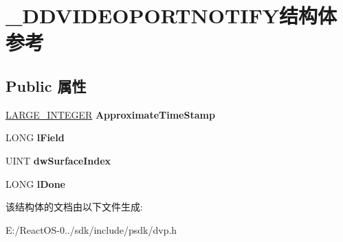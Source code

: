 \hypertarget{struct___d_d_v_i_d_e_o_p_o_r_t_n_o_t_i_f_y}{}\section{\+\_\+\+D\+D\+V\+I\+D\+E\+O\+P\+O\+R\+T\+N\+O\+T\+I\+F\+Y结构体 参考}
\label{struct___d_d_v_i_d_e_o_p_o_r_t_n_o_t_i_f_y}
\subsection*{Public 属性}
\begin{DoxyCompactItemize}
\item 
\mbox{\label{struct___d_d_v_i_d_e_o_p_o_r_t_n_o_t_i_f_y_a885ceac96702913591503ab3dd17159e}} 
\hyperlink{union___l_a_r_g_e___i_n_t_e_g_e_r}{L\+A\+R\+G\+E\+\_\+\+I\+N\+T\+E\+G\+ER} {\bfseries Approximate\+Time\+Stamp}
\item 
\mbox{\label{struct___d_d_v_i_d_e_o_p_o_r_t_n_o_t_i_f_y_a90b62c03de43df4ff69af7d9c2c41746}} 
L\+O\+NG {\bfseries l\+Field}
\item 
\mbox{\label{struct___d_d_v_i_d_e_o_p_o_r_t_n_o_t_i_f_y_aabededfd79107ff5a707d5ec6fb8167d}} 
U\+I\+NT {\bfseries dw\+Surface\+Index}
\item 
\mbox{\label{struct___d_d_v_i_d_e_o_p_o_r_t_n_o_t_i_f_y_a8daf10097f3d94595b1c11c63b2f1f0b}} 
L\+O\+NG {\bfseries l\+Done}
\end{DoxyCompactItemize}


该结构体的文档由以下文件生成\+:\begin{DoxyCompactItemize}
\item 
E\+:/\+React\+O\+S-\/0../sdk/include/psdk/dvp.\+h\end{DoxyCompactItemize}
